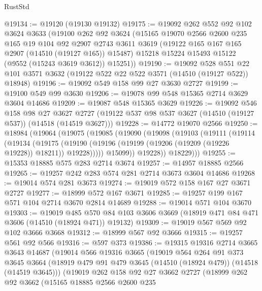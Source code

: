 \begin{lexlean}{RustStd}
\begin{coremodule}
@19134 := @19120 (@19130 @19132)
@19175 := @19092
    @262
    @552
    @92
    @102
    @3624
    @3633
    (@19100
      @262
      @92
      @3624
      (@15165
        @19070
        @2566
        @2600
        @235
        @165
        @19
        @104
        @92
        @2907
        @2743
        @3611
        @3619
        (@19122 @165 @167 @165 @2907 (@14510 (@19127 @165)) @15487)
        @15218
        @15224
        @15493
        @15122
        (@9552 (@15243 @3619 @3612))
        @15251))
@19190 := @19092
    @528
    @551
    @22
    @101
    @3571
    @3632
    (@19122 @522 @22 @522 @3571 (@14510 (@19127 @522)) @18948)
@19196 := @19092 @549 @158 @99 @27 @3630 @2727
@19199 := @19100 @549 @99 @3630
@19206 := @19078 @99 @548 @15365 @2714 @3629 @3604 @14686
@19209 := @19087 @548 @15365 @3629
@19226 := @19092
    @546
    @158
    @98
    @27
    @3627
    @2727
    (@19122 @537 @98 @537 @3627 (@14510 (@19127 @537)) (@14518 (@14519 @3627)))
@19228 := @14772 @19070 @2566
@19250 := @18984
    (@19064
      (@19075
        (@19085
          (@19090
            (@19098
              (@19103
                (@19111
                  (@19114
                    (@19134
                      (@19175
                        (@19190
                          (@19196 (@19199 (@19206 (@19209 (@19226 @19228)) @18211)) @19228)))))
                  @15099))
              @19228))
          @18229)))
@19255 := @15353 @18885 @575 @283 @2714 @3674
@19257 := @14957 @18885 @2566
@19265 := @19257 @242 @283 @574 @281 @2714 @3673 @3604 @14686
@19268 := @19014 @574 @281 @3673
@19274 := @19019 @572 @158 @167 @27 @3671 @2727
@19277 := @18999 @572 @167 @3671
@19285 := @19257 @199 @167 @571 @104 @2714 @3670 @2814 @14689
@19288 := @19014 @571 @104 @3670
@19303 := @19019
    @485
    @570
    @84
    @103
    @3606
    @3669
    (@18919 @471 @84 @471 @3606 (@14510 (@18924 @471)) @19132)
@19309 := @19019 @567 @569 @92 @102 @3666 @3668
@19312 := @18999 @567 @92 @3666
@19315 := @19257 @561 @92 @566
@19316 := @597 @373
@19386 := @19315
    @19316
    @2714
    @3665
    @3643
    @14687
    (@19014
      @566
      @19316
      @3665
      (@19019
        @564
        @264
        @91
        @373
        @3645
        @3664
        (@18919 @479 @91 @479 @3645 (@14510 (@18924 @479)) (@14518 (@14519 @3645)))
        (@19019
          @262
          @158
          @92
          @27
          @3662
          @2727
          (@18999
            @262
            @92
            @3662
            (@15165
              @18885
              @2566
              @2600
              @235

\end{coremodule}
\end{lexlean}
